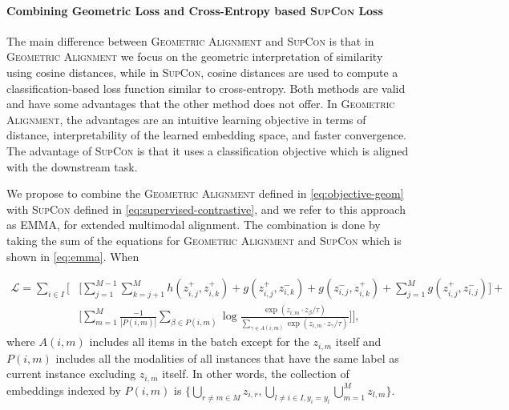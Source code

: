 \documentclass[10pt]{article} %
\newcommand{\ours}{\textsc{EMMA}}
\newcommand{\geom}{\textsc{Geometric Alignment}}
\newcommand{\supcon}{\textsc{SupCon}}
\begin{document}
\paragraph{Combining Geometric Loss and Cross-Entropy based \supcon{} Loss}
\label{subsec:emma}

The main difference between \geom{} and \supcon{} is that in \geom{} we focus on the geometric interpretation of similarity using cosine distances, while in \supcon{}, cosine distances are used to compute a classification-based loss function similar to cross-entropy.
Both methods are valid and have some advantages that the other method does not offer. In \geom{}, the advantages are an intuitive learning objective in terms of distance, interpretability of the learned embedding space, and faster convergence. 
The advantage of \supcon{} is that it uses a classification objective which is aligned with the downstream task.

We propose to combine the \geom{} defined in \cref{eq:objective-geom} with \supcon{} defined in \cref{eq:supervised-contrastive}, and we refer to this approach as \ours{}, for extended multimodal alignment. The combination is done by taking the sum of the equations for \geom{} and \supcon{} which is shown in \cref{eq:emma}.
When


\begin{equation}\label{eq:emma}
\begin{split}
    \mathcal{L} =  \sum_{i \in I} \Biggr[ & \Bigr[ \sum_{j=1}^{M-1} \sum_{k=j+1}^{M} h( z_{i,j}^{+} , z_{i,k}^{+})
     + g( z_{i,j}^{+} , z_{i,k}^{-}) + g( z_{i,j}^{-} , z_{i,k}^{+}) + \sum_{j=1}^{M} g( z_{i,j}^{+} , z_{i,j}^{-} )\Bigr] + \\
     & \Bigr[ \sum_{m=1}^{M} \frac{-1}{|P(i,m)|}  \sum_{\beta \in P(i,m)} \log \frac{\exp (z_{i,m} \cdot z_{\beta} / \tau) }{\sum_{\gamma \in A(i,m)} \exp (z_{i,m} \cdot z_{\gamma} / \tau)} \Bigr] \Biggr], 
     \end{split}
\end{equation}
where $A(i,m)$ includes all items in the batch except for the $z_{i,m}$ itself and $P(i,m)$ includes all the modalities of all instances that have the same label as current instance excluding $z_{i,m}$ itself. 
In other words, the collection of embeddings indexed by $P(i,m)$ is $\{ \bigcup\limits_{r \neq m \in M} z_{i,r}, \bigcup\limits_{l \neq i \in I , y_i = y_l} \bigcup\limits_{m=1}^{M} z_{l,m} \} $.

\end{document}
